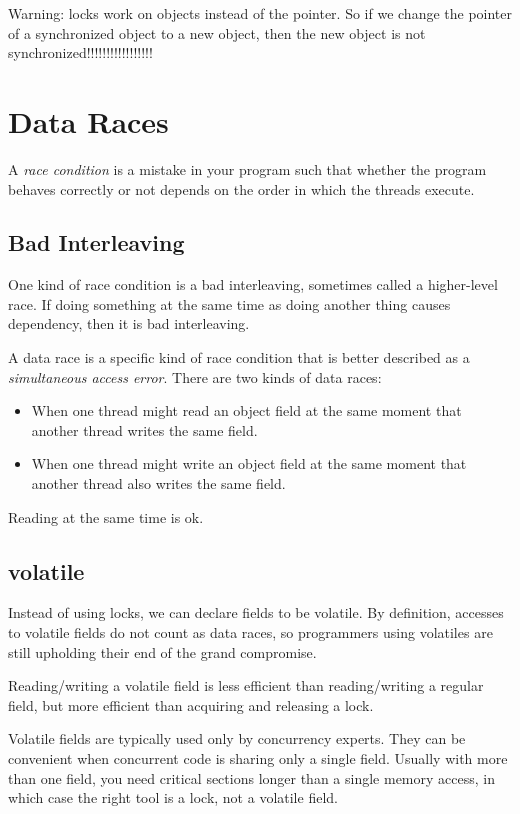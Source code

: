 \documentclass[letterpaper,12pt]{article}
\begin{document}
Warning: locks work on objects instead of the pointer. So if we change the pointer of a synchronized object to a new object, then the new object is not synchronized!!!!!!!!!!!!!!!!!

\section{Data Races}
A \textit{race condition} is a mistake in your program such that whether the program behaves correctly or not depends on the order in which the threads execute. 

\subsection{Bad Interleaving}
One kind of race condition is a bad interleaving, sometimes called a higher-level race. If doing something at the same time as doing another thing causes dependency, then it is bad interleaving. 

A data race is a specific kind of race condition that is better described as a \textit{simultaneous access error}. There are two kinds of data races:\begin{itemize}
      \item When one thread might read an object field at the same moment that another thread writes the same field.
      \item When one thread might write an object field at the same moment that another thread also writes the same field.
\end{itemize}
Reading at the same time is ok. 

\subsection{volatile}
Instead of using locks, we can declare fields to be volatile. By definition, accesses to volatile fields do not count as data races, so programmers using volatiles are still upholding their end of the grand compromise.

Reading/writing a volatile field is less efficient than reading/writing a regular field, but more efficient than acquiring and releasing a lock.

Volatile fields are typically used only by concurrency experts. They can be convenient when concurrent code is sharing only a single field. Usually with more than one field, you need critical sections longer than a single memory access, in which case the right tool is a lock, not a volatile field.
\end{document}
